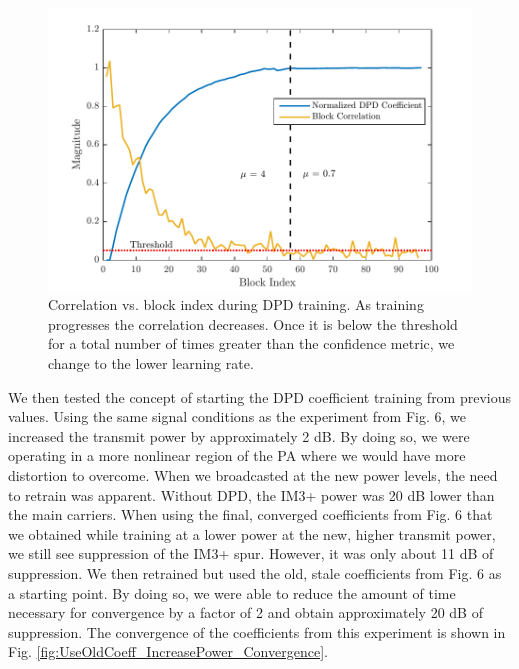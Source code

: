 \begin{figure}[t!] 
\centering
\includegraphics[width=0.9\columnwidth]{Figures/Convergence_Mu}
\caption{Correlation vs. block index during DPD training. 
	As training progresses the correlation decreases. 
	Once it is below the threshold for a total number of times greater than the confidence metric, we change to the lower learning rate.}
\label{fig:Convergence_Mu}
\vspace{-10pt}
\end{figure}

We then tested the concept of starting the DPD coefficient training from previous values. 
Using the same signal conditions as the experiment from Fig. 6, we increased the transmit power by approximately 2 dB.
 By doing so, we were operating in a more nonlinear region of the PA where we would have more distortion to overcome. 
 When we broadcasted at the new power levels, the need to retrain was apparent. 
 Without DPD, the IM3+ power was 20 dB lower than the main carriers. When using the final, converged coefficients from Fig. 6 that we obtained while training at a lower power at the new, higher transmit power, we still see suppression of the IM3+ spur. 
 However, it was only about 11 dB of suppression. 
 We then retrained but used the old, stale coefficients from Fig. 6 as a starting point. 
 By doing so, we were able to reduce the amount of time necessary for convergence by a factor of 2 and obtain approximately 20 dB of suppression. 
 The convergence of the coefficients from this experiment is shown in Fig. \ref{fig:UseOldCoeff_IncreasePower_Convergence}. 


